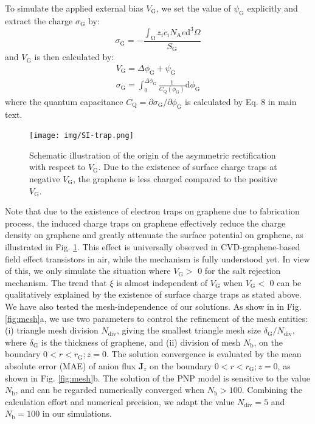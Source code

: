 \documentclass[manuscript=suppinfo,email=true, hyperref=true, keywords=false]{achemso}
\newcommand{\Fig}{Fig.}
\begin{document}
To simulate the applied external bias $V_{\mathrm{G}}$, we set the
value of $\psi_{\mathrm{G}}$ explicitly and extract the charge
$\sigma_{\mathrm{G}}$ by:
\begin{equation}
  \label{eq:sigma-G}
  \sigma_{\mathrm{G}} = - {\displaystyle \frac{\int_{\mathrm{\Omega}} z_{i} c_{i} N_{\mathrm{A}} e \mathrm{d}^{3} \Omega}{S_{\mathrm{G}}}}
\end{equation}
and $V_{\mathrm{G}}$ is then calculated by:
\begin{eqnarray}
  \label{eq:VG}
  V_{\mathrm{G}} = \Delta \phi_{\mathrm{G}} + \psi_{\mathrm{G}}\\
  \sigma_{\mathrm{G}} = \int_{0}^{\Delta \phi_{\mathrm{G}}} \frac{1}{C_{\mathrm{Q}}(\phi_{\mathrm{G}})} \mathrm{d} \phi_{\mathrm{G}}
\end{eqnarray}
where the quantum capacitance
$C_{\mathrm{Q}}=\partial \sigma_{\mathrm{G}}/\partial
\phi_{\mathrm{G}}$ is calculated by Eq. 8 in main text.

\begin{figure}[htbp]
  \centering
  \texttt{[image: img/SI-trap.png]}
  \caption{Schematic illustration of the origin of the asymmetric
    rectification with respect to $V_{\mathrm{G}}$. Due to the
    existence of surface charge traps at negative $V_{\mathrm{G}}$,
    the graphene is less charged compared to the positive
    $V_{\mathrm{G}}$.}
  \label{fig:trap}
\end{figure}

Note that due to the existence of electron traps on graphene due to
fabrication process, the induced charge traps on graphene effectively
reduce the charge density on graphene and greatly attenuate the
surface potential on graphene, as illustrated in \Fig
\ref{fig:trap}. This effect is universally observed in
CVD-graphene-based field effect transistors in air, while the
mechanism is fully understood yet. In view of this, we only simulate
the situation where $V_{\mathrm{G}}>$ 0 for the salt rejection
mechanism. The trend that $\xi$ is almost independent of
$V_{\mathrm{G}}$ when $V_{\mathrm{G}}<$ 0 can be qualitatively
explained by the existence of surface charge traps as stated above.
We have also tested the mesh-independence of our solutions. As show in
in \Fig{} \ref{fig:mesh}a, we use two parameters to control the
refinement of the mesh entities: (i) triangle mesh division
$N_{\mathrm{div}}$, giving the smallest triangle mesh size
$\delta_{\mathrm{G}} / N_{\mathrm{div}}$, where $\delta_{\mathrm{G}}$
is the thickness of graphene, and (ii) division of mesh
$N_{\mathrm{b}}$, on the boundary $0<r<r_{\mathrm{G}};z=0$. The
solution convergence is evaluated by the mean absolute error (MAE) of
anion flux $\boldsymbol{J}_{z}$ on the boundary
$0<r<r_{\mathrm{G}};z=0$, as shown in \Fig{}
\ref{fig:mesh}b. The solution of the PNP model is sensitive to the
value $N_{\mathrm{b}}$, and can be regarded numerically converged when
$N_{\mathrm{b}}>100$. Combining the calculation effort and numerical
precision, we adapt the value $N_{\mathrm{div}}=5$ and
$N_{\mathrm{b}}=100$ in our simulations.
\end{document}
